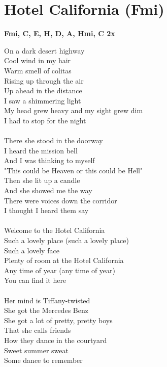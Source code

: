 \section{Hotel California (F\kr mi)}
\footnotesize\textbf{F\kr mi, C\kr \7, E, H, D, A, Hmi, C\kr \7 2x}
\normalsize
\begin{multicols}{2}
On a dark desert highway\\
Cool wind in my hair\\
Warm smell of colitas\\
Rising up through the air\\
Up ahead in the distance\\
I saw a shimmering light\\
My head grew heavy and my sight grew dim\\
I had to stop for the night\\
\\
There she stood in the doorway\\
I heard the mission bell\\
And I was thinking to myself\\
"This could be Heaven or this could be Hell"\\
Then she lit up a candle\\
And she showed me the way\\
There were voices down the corridor\\
I thought I heard them say\\
\\
Welcome to the Hotel California\\
Such a lovely place (such a lovely place)\\
Such a lovely face\\
Plenty of room at the Hotel California\\
Any time of year (any time of year)\\
You can find it here\\
\columnbreak
\\
Her mind is Tiffany-twisted\\
She got the Mercedes Benz\\
She got a lot of pretty, pretty boys\\
That she calls friends\\
How they dance in the courtyard\\
Sweet summer sweat\\
Some dance to remember\\

\end{multicols}
